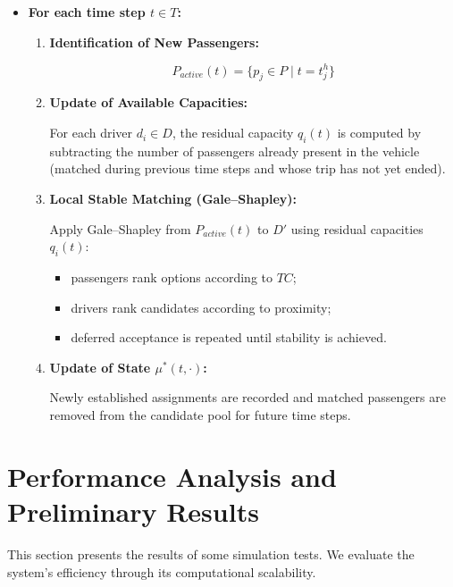 \documentclass[11pt,a4paper]{article}
\begin{document}
\begin{itemize}
    \item[] \textbf{For each time step $t\in T$:}

    \begin{enumerate}

        \item \textbf{Identification of New Passengers:}

$$
P_{active}(t)=\{p_j\in P\mid t=t_j^h\}
$$

        \item \textbf{Update of Available Capacities:}

        For each driver $d_i\in D$, the residual capacity $q_i(t)$ is computed by subtracting the number of passengers already present in the vehicle (matched during previous time steps and whose trip has not yet ended).

        \item \textbf{Local Stable Matching (Gale--Shapley):}

        Apply Gale--Shapley from $P_{active}(t)$ to $D'$ using residual capacities $q_i(t)$:

        \begin{itemize}

            \item passengers rank options according to $TC$;

            \item drivers rank candidates according to proximity;

            \item deferred acceptance is repeated until stability is achieved.

        \end{itemize}

        \item \textbf{Update of State $\mu^*(t,\cdot)$:}

        Newly established assignments are recorded and matched passengers are removed from the candidate pool for future time steps.

    \end{enumerate}

\end{itemize}

\section{Performance Analysis and Preliminary Results}\label{sec:performance}
This section presents the results of some simulation tests. We evaluate the system's efficiency through its computational scalability.
\end{document}
